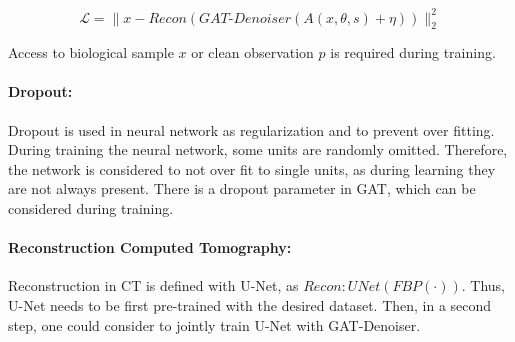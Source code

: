 \begin{equation}
  \label{eq:loss_reco}
  \mathcal{L} = \parallel x - \textit{Recon} ( \textit{GAT-Denoiser}(A(x, \theta, s) + \eta)) \parallel ^2_2
\end{equation}

Access to biological sample $x$ or clean observation $p$ is required during training.

\paragraph{Dropout:}
Dropout is used in neural network as regularization and to prevent over fitting. 
During training the neural network, some units are randomly omitted. Therefore, the network is 
considered to not over fit to single units, as during learning they are not always present.
There is a dropout parameter in GAT, which can be considered during training. 


\paragraph{Reconstruction Computed Tomography:}
Reconstruction in CT is defined with U-Net, as $\textit{Recon} : \textit{UNet} \left( \textit{FBP} \left( \cdot \right) \right)$.
Thus, U-Net needs to be first pre-trained with the desired dataset.
Then, in a second step, one could consider to jointly train U-Net with GAT-Denoiser.